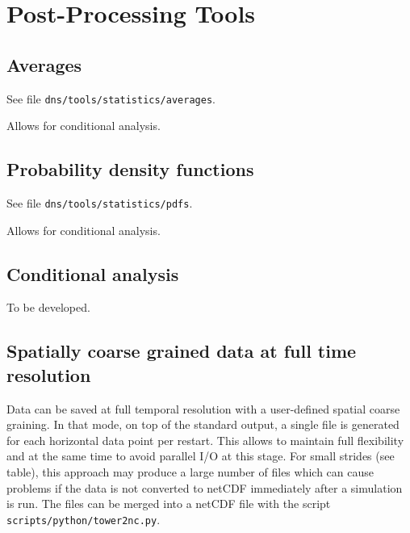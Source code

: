 \chapter{Post-Processing Tools}\label{sec:postprocessing}

\section{Averages}

See file {\tt dns/tools/statistics/averages}.

Allows for conditional analysis.

\section{Probability density functions}

See file {\tt dns/tools/statistics/pdfs}.

Allows for conditional analysis.

\section{Conditional analysis}

To be developed.

\section{Spatially coarse grained data at full time resolution}

Data can be saved at full temporal resolution with a user-defined spatial coarse graining. In that mode, on top of the standard output, a single file is generated for each horizontal  data point per restart. This allows to maintain full flexibility and at the same time to  avoid parallel I/O at this stage.
%
For small strides (see table), this approach may produce a large number of files which can cause problems if the data is not converted to netCDF immediately after a simulation is run.
%
The files can be merged into a netCDF file with the script \texttt{scripts/python/tower2nc.py}.


